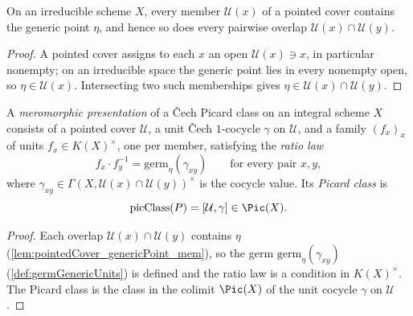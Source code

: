\begin{lemma}
  \label{lem:pointedCover_genericPoint_mem}
  \leanok
  On an irreducible scheme \(X\), every member \(\mathcal U(x)\) of a pointed cover contains the
  generic point \(\eta\), and hence so does every pairwise overlap \(\mathcal U(x) \cap \mathcal
  U(y)\).
\end{lemma}
\begin{proof}
  \leanok
  A pointed cover assigns to each \(x\) an open \(\mathcal U(x) \ni x\), in particular nonempty;
  on an irreducible space the generic point lies in every nonempty open, so \(\eta \in \mathcal
  U(x)\). Intersecting two such memberships gives \(\eta \in \mathcal U(x) \cap \mathcal U(y)\).
\end{proof}

\begin{definition}
  \label{def:meromorphicPresentation}
  \leanok
  A \emph{meromorphic presentation} of a \v Cech Picard class on an integral scheme \(X\) consists
  of a pointed cover \(\mathcal U\), a unit \v Cech \(1\)-cocycle \(\gamma\) on \(\mathcal U\), and
  a family \((f_x)_x\) of units \(f_x \in K(X)^{\times}\), one per member, satisfying the
  \emph{ratio law}
  \[
    f_x \cdot f_y^{-1} = \mathrm{germ}_\eta(\gamma_{xy}) \qquad \text{for every pair } x, y,
  \]
  where \(\gamma_{xy} \in \Gamma(X, \mathcal U(x) \cap \mathcal U(y))^{\times}\) is the cocycle
  value. Its \emph{Picard class} is
  \[
    \mathrm{picClass}(P) = [\mathcal U, \gamma] \in \Pic(X).
  \]
\end{definition}
\begin{proof}
  \leanok
  Each overlap \(\mathcal U(x) \cap \mathcal U(y)\) contains \(\eta\)
  (\ref{lem:pointedCover_genericPoint_mem}), so the germ \(\mathrm{germ}_\eta(\gamma_{xy})\)
  (\ref{def:germGenericUnits}) is defined and the ratio law is a condition in \(K(X)^{\times}\).
  The Picard class is the class in the colimit \(\Pic(X)\) of the unit cocycle \(\gamma\) on
  \(\mathcal U\).
\end{proof}

